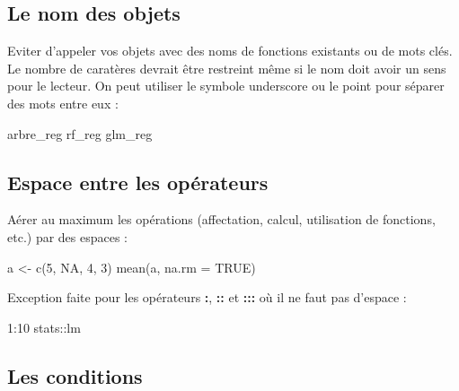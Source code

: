 \documentclass[
]{book}
\newenvironment{Shaded}{\begin{snugshade}}{\end{snugshade}}
\newcommand{\AttributeTok}[1]{\textcolor[rgb]{0.77,0.63,0.00}{#1}}
\newcommand{\ConstantTok}[1]{\textcolor[rgb]{0.00,0.00,0.00}{#1}}
\newcommand{\DecValTok}[1]{\textcolor[rgb]{0.00,0.00,0.81}{#1}}
\newcommand{\FunctionTok}[1]{\textcolor[rgb]{0.00,0.00,0.00}{#1}}
\newcommand{\NormalTok}[1]{#1}
\newcommand{\OtherTok}[1]{\textcolor[rgb]{0.56,0.35,0.01}{#1}}
\newcommand{\SpecialCharTok}[1]{\textcolor[rgb]{0.00,0.00,0.00}{#1}}
\theoremstyle{definition}
\theoremstyle{definition}
\theoremstyle{definition}
\theoremstyle{definition}
\theoremstyle{remark}
\begin{document}
\hypertarget{le-nom-des-objets}{%
\subsection{Le nom des objets}\label{le-nom-des-objets}}

Eviter d'appeler vos objets avec des noms de fonctions existants ou de mots clés. Le nombre de caratères devrait être restreint même si le nom doit avoir un sens pour le lecteur. On peut utiliser le symbole underscore ou le point pour séparer des mots entre eux :

\begin{Shaded}
\begin{Highlighting}[]
\NormalTok{arbre\_reg}
\NormalTok{rf\_reg}
\NormalTok{glm\_reg}
\end{Highlighting}
\end{Shaded}

\hypertarget{espace-entre-les-opuxe9rateurs}{%
\subsection{Espace entre les opérateurs}\label{espace-entre-les-opuxe9rateurs}}

Aérer au maximum les opérations (affectation, calcul, utilisation de fonctions, etc.) par des espaces :

\begin{Shaded}
\begin{Highlighting}[]
\NormalTok{a }\OtherTok{\textless{}{-}} \FunctionTok{c}\NormalTok{(}\DecValTok{5}\NormalTok{, }\ConstantTok{NA}\NormalTok{, }\DecValTok{4}\NormalTok{, }\DecValTok{3}\NormalTok{) }
\FunctionTok{mean}\NormalTok{(a, }\AttributeTok{na.rm =} \ConstantTok{TRUE}\NormalTok{)}
\end{Highlighting}
\end{Shaded}

Exception faite pour les opérateurs \textbf{:}, \textbf{::} et \textbf{:::} où il ne faut pas d'espace :

\begin{Shaded}
\begin{Highlighting}[]
\DecValTok{1}\SpecialCharTok{:}\DecValTok{10}
\NormalTok{stats}\SpecialCharTok{::}\NormalTok{lm}
\end{Highlighting}
\end{Shaded}

\hypertarget{les-conditions}{%
\subsection{Les conditions}\label{les-conditions}}
\end{document}
